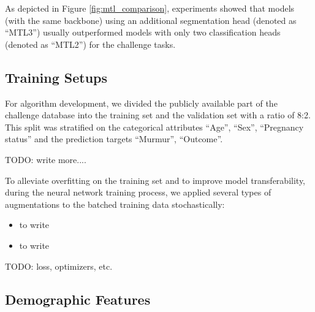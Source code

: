 As depicted in Figure \ref{fig:mtl_comparison}, experiments showed that models (with the same backbone) using an additional segmentation head (denoted as ``MTL3'') usually outperformed models with only two classification heads (denoted as ``MTL2'') for the challenge tasks.

\subsection{Training Setups}
\label{subsec:training}

For algorithm development, we divided the publicly available part of the challenge database into the training set and the validation set with a ratio of 8:2. This split was stratified on the categorical attributes ``Age'', ``Sex'', ``Pregnancy status'' and the prediction targets ``Murmur'', ``Outcome''.

TODO: write more....

To alleviate overfitting on the training set and to improve model transferability, during the neural network training process, we applied several types of augmentations to the batched training data stochastically:
\begin{itemize}
    \item to write
    \item to write
\end{itemize}

TODO: loss, optimizers, etc.

% 

\subsection{Demographic Features}
\label{subsec:demo_feat}

